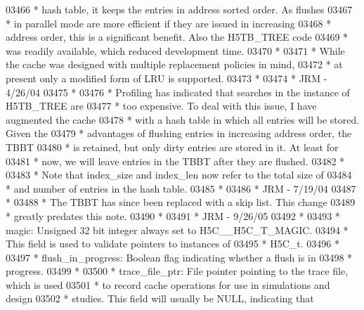 \begin{DoxyCode}
03466 \textcolor{comment}{ * hash table, it keeps the entries in address sorted order.  As flushes}
03467 \textcolor{comment}{ * in parallel mode are more efficient if they are issued in increasing}
03468 \textcolor{comment}{ * address order, this is a significant benefit.  Also the H5TB\_TREE code}
03469 \textcolor{comment}{ * was readily available, which reduced development time.}
03470 \textcolor{comment}{ *}
03471 \textcolor{comment}{ * While the cache was designed with multiple replacement policies in mind,}
03472 \textcolor{comment}{ * at present only a modified form of LRU is supported.}
03473 \textcolor{comment}{ *}
03474 \textcolor{comment}{ *                                              JRM - 4/26/04}
03475 \textcolor{comment}{ *}
03476 \textcolor{comment}{ * Profiling has indicated that searches in the instance of H5TB\_TREE are}
03477 \textcolor{comment}{ * too expensive.  To deal with this issue, I have augmented the cache}
03478 \textcolor{comment}{ * with a hash table in which all entries will be stored.  Given the}
03479 \textcolor{comment}{ * advantages of flushing entries in increasing address order, the TBBT}
03480 \textcolor{comment}{ * is retained, but only dirty entries are stored in it.  At least for}
03481 \textcolor{comment}{ * now, we will leave entries in the TBBT after they are flushed.}
03482 \textcolor{comment}{ *}
03483 \textcolor{comment}{ * Note that index\_size and index\_len now refer to the total size of}
03484 \textcolor{comment}{ * and number of entries in the hash table.}
03485 \textcolor{comment}{ *}
03486 \textcolor{comment}{ *                      JRM - 7/19/04}
03487 \textcolor{comment}{ *}
03488 \textcolor{comment}{ * The TBBT has since been replaced with a skip list.  This change}
03489 \textcolor{comment}{ * greatly predates this note.}
03490 \textcolor{comment}{ *}
03491 \textcolor{comment}{ *                      JRM - 9/26/05}
03492 \textcolor{comment}{ *}
03493 \textcolor{comment}{ * magic:   Unsigned 32 bit integer always set to H5C\_\_H5C\_T\_MAGIC. }
03494 \textcolor{comment}{ *      This field is used to validate pointers to instances of}
03495 \textcolor{comment}{ *      H5C\_t.}
03496 \textcolor{comment}{ *}
03497 \textcolor{comment}{ * flush\_in\_progress: Boolean flag indicating whether a flush is in}
03498 \textcolor{comment}{ *      progress.}
03499 \textcolor{comment}{ *}
03500 \textcolor{comment}{ * trace\_file\_ptr:  File pointer pointing to the trace file, which is used}
03501 \textcolor{comment}{ *              to record cache operations for use in simulations and design}
03502 \textcolor{comment}{ *              studies.  This field will usually be NULL, indicating that}

\end{DoxyCode}
